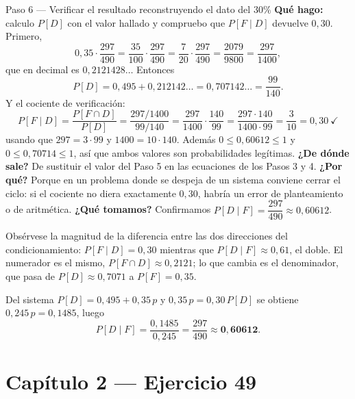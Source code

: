 \documentclass[11pt]{article}
\begin{document}
\begin{sol}
\begin{paso}{Paso 6 --- Verificar el resultado reconstruyendo el dato del $30\%$}
\textbf{Qu\'e hago:} calculo $P[D]$ con el valor hallado y compruebo que $P[F\mid D]$ devuelve $0{,}30$. Primero,
\[
0{,}35\cdot\frac{297}{490}=\frac{35}{100}\cdot\frac{297}{490}=\frac{7}{20}\cdot\frac{297}{490}=\frac{2079}{9800}=\frac{297}{1400},
\]
que en decimal es $0{,}2121428\ldots$ Entonces
\[
P[D]=0{,}495+0{,}212142\ldots=0{,}707142\ldots=\frac{99}{140}.
\]
Y el cociente de verificaci\'on:
\[
P[F\mid D]=\frac{P[F\cap D]}{P[D]}=\frac{297/1400}{99/140}=\frac{297}{1400}\cdot\frac{140}{99}=\frac{297\cdot 140}{1400\cdot 99}=\frac{3}{10}=0{,}30\ \checkmark
\]
usando que $297=3\cdot 99$ y $1400=10\cdot 140$. Adem\'as $0\le 0{,}60612\le 1$ y $0\le 0{,}70714\le 1$, as\'i que ambos valores son probabilidades leg\'itimas.
\textbf{¿De d\'onde sale?} De sustituir el valor del Paso 5 en las ecuaciones de los Pasos 3 y 4.
\textbf{¿Por qu\'e?} Porque en un problema donde se despeja de un sistema conviene cerrar el ciclo: si el cociente no diera exactamente $0{,}30$, habr\'ia un error de planteamiento o de aritm\'etica.
\textbf{¿Qu\'e tomamos?} Confirmamos $P[D\mid F]=\dfrac{297}{490}\approx 0{,}60612$.
\end{paso}

\begin{nota}
Obs\'ervese la magnitud de la diferencia entre las dos direcciones del condicionamiento: $P[F\mid D]=0{,}30$ mientras que $P[D\mid F]\approx 0{,}61$, el doble. El numerador es el mismo, $P[F\cap D]\approx 0{,}2121$; lo que cambia es el denominador, que pasa de $P[D]\approx 0{,}7071$ a $P[F]=0{,}35$.
\end{nota}

\end{sol}

\begin{resp}
Del sistema $P[D]=0{,}495+0{,}35\,p$ y $0{,}35\,p=0{,}30\,P[D]$ se obtiene $0{,}245\,p=0{,}1485$, luego
\[
P[D\mid F]=\frac{0{,}1485}{0{,}245}=\frac{297}{490}\approx \mathbf{0{,}60612}.
\]
\end{resp}

\section*{Cap\'itulo 2 --- Ejercicio 49}
\end{document}
